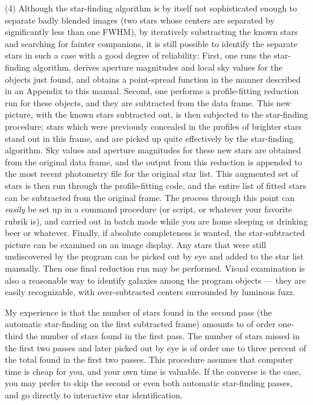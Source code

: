 \item{(4)} Although the star-finding algorithm is by itself not
sophisticated enough to separate badly blended images (two stars whose
centers are separated by significantly less than one FWHM), by
iteratively substracting the known stars and searching for fainter
companions, it is still possible to identify the separate stars in such
a case with a good degree of reliability:  First, one runs the
star-finding algorithm, derives aperture magnitudes and local sky
values for the objects just found, and obtains a point-spread function
in the manner described in an Appendix to this manual.  Second, one
performs a profile-fitting reduction run for these objects, and they
are subtracted from the data frame. This new picture, with the known
stars subtracted out, is then subjected to the star-finding procedure;
stars which were previously concealed in the profiles of brighter stars
stand out in this frame, and are picked up quite effectively by the
star-finding algorithm.  Sky values and aperture magnitudes for these
new stars are obtained from the original data frame, and the output
from this reduction is appended to the most recent photometry file for
the original star list.  This augmented set of stars is then run
through the profile-fitting code, and the entire list of fitted stars
can be subtracted from the original frame.  The process through this
point can {\it easily\/} be set up in a command procedure (or script,
or whatever your favorite rubrik is), and carried out in batch mode
while you are home sleeping or drinking beer or whatever.  Finally, if
absolute completeness is wanted, the star-subtracted picture can be
examined on an image display.  Any stars that were still undiscovered
by the program can be picked out by eye and added to the star list
manually.  Then one final reduction run may be performed.  Visual
examination is also a reasonable way to identify galaxies among the
program objects --- they are easily recognizable, with over-subtracted
centers surrounded by luminous fuzz.

\item{} My experience is that the number of stars found in the second
pass (the automatic star-finding on the first subtracted frame) amounts
to of order one-third the number of stars found in the first pass.  The
number of stars missed in the first two passes and later picked out by
eye is of order one to three percent of the total found in the first
two passes.  This procedure assumes that computer time is cheap for
you, and your own time is valuable.  If the converse is the case, you
may prefer to skip the second or even both automatic star-finding
passes, and go directly to interactive star identification.

